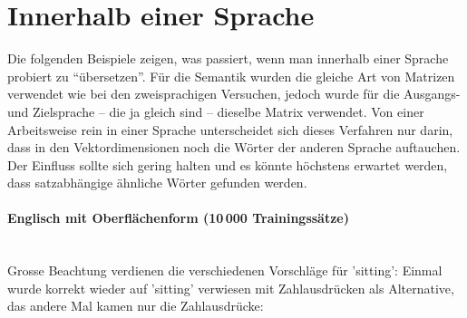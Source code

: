 \documentclass[11pt,twoside,openright]{mpreport}
\begin{document}
\section{Innerhalb einer Sprache}
Die folgenden Beispiele zeigen, was passiert, wenn man innerhalb einer Sprache probiert zu ``übersetzen''. Für die Semantik wurden die gleiche Art von Matrizen verwendet wie bei den zweisprachigen Versuchen, jedoch wurde für die Ausgangs- und Zielsprache -- die ja gleich sind -- dieselbe Matrix verwendet. Von einer Arbeitsweise rein in einer Sprache unterscheidet sich dieses Verfahren nur darin, dass in den Vektordimensionen noch die Wörter der anderen Sprache auftauchen. Der Einfluss sollte sich gering halten und es könnte höchstens erwartet werden, dass satzabhängige ähnliche Wörter gefunden werden.
\paragraph{Englisch mit Oberflächenform (10\,000 Trainingssätze)\\\\}
Grosse Beachtung verdienen die verschiedenen Vorschläge für 'sitting': Einmal wurde korrekt wieder auf 'sitting' verwiesen mit Zahlausdrücken als Alternative, das andere Mal kamen nur die Zahlausdrücke:
\end{document}
